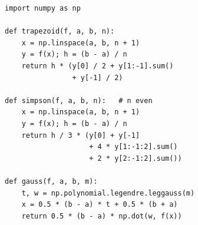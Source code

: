 \documentclass[10pt,twocolumn,a4paper]{article}
\theoremstyle{plain}
\theoremstyle{remark}
\begin{document}
\begin{lstlisting}
import numpy as np

def trapezoid(f, a, b, n):
    x = np.linspace(a, b, n + 1)
    y = f(x); h = (b - a) / n
    return h * (y[0] / 2 + y[1:-1].sum()
                + y[-1] / 2)

def simpson(f, a, b, n):   # n even
    x = np.linspace(a, b, n + 1)
    y = f(x); h = (b - a) / n
    return h / 3 * (y[0] + y[-1]
                    + 4 * y[1:-1:2].sum()
                    + 2 * y[2:-1:2].sum())

def gauss(f, a, b, m):
    t, w = np.polynomial.legendre.leggauss(m)
    x = 0.5 * (b - a) * t + 0.5 * (b + a)
    return 0.5 * (b - a) * np.dot(w, f(x))
\end{lstlisting}



\end{document}
